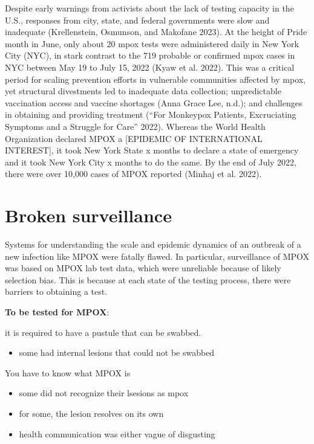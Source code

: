 \documentclass[
  letterpaper,
  DIV=11,
  numbers=noendperiod,
  oneside]{scrreprt}
\providecommand{\tightlist}{%
  \setlength{\itemsep}{0pt}\setlength{\parskip}{0pt}}\usepackage{longtable,booktabs,array}
\begin{document}
Despite early warnings from activists about the lack of testing capacity
in the U.S., responses from city, state, and federal governments were
slow and inadequate (Krellenstein, Osmunson, and Makofane 2023). At the
height of Pride month in June, only about 20 mpox tests were
administered daily in New York City (NYC), in stark contrast to the 719
probable or confirmed mpox cases in NYC between May 19 to July 15, 2022
(Kyaw et al. 2022). This was a critical period for scaling prevention
efforts in vulnerable communities affected by mpox, yet structural
divestments led to inadequate data collection; unpredictable vaccination
access and vaccine shortages (Anna Grace Lee, n.d.); and challenges in
obtaining and providing treatment ({``For Monkeypox Patients,
Excruciating Symptoms and a Struggle for Care''} 2022). Whereas the
World Health Organization declared MPOX a {[}EPIDEMIC OF INTERNATIONAL
INTEREST{]}, it took New York State x months to declare a state of
emergency and it took New York City x months to do the same. By the end
of July 2022, there were over 10,000 cases of MPOX reported (Minhaj et
al. 2022).

\hypertarget{broken-surveillance}{%
\section{Broken surveillance}\label{broken-surveillance}}

Systems for understanding the scale and epidemic dynamics of an outbreak
of a new infection like MPOX were fatally flawed. In particular,
surveillance of MPOX was based on MPOX lab test data, which were
unreliable because of likely selection bias. This is because at each
state of the testing process, there were barriers to obtaining a test.

\textbf{To be tested for MPOX}:

it is required to have a pustule that can be swabbed.

\begin{itemize}
\tightlist
\item
  some had internal lesions that could not be swabbed
\end{itemize}

You have to know what MPOX is

\begin{itemize}
\item
  some did not recognize their lsesions as mpox
\item
  for some, the lesion resolves on its own
\item
  health communication was either vague of disgusting
\end{itemize}
\end{document}
